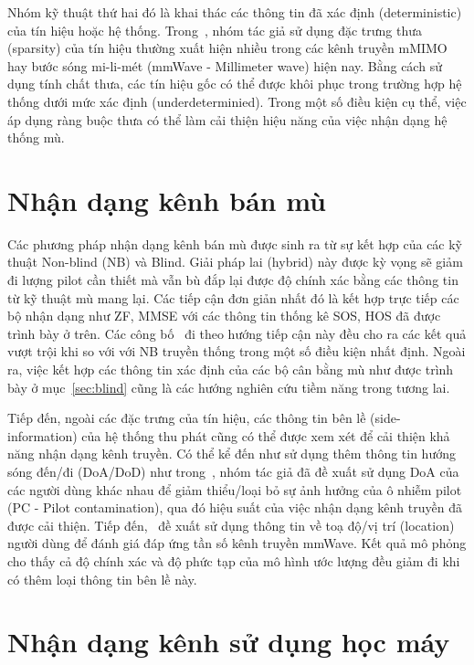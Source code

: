 Nhóm kỹ thuật thứ hai đó là khai thác các thông tin đã xác định (deterministic) của tín hiệu hoặc hệ thống. Trong~\cite{Bey2011}, nhóm tác giả sử dụng đặc trưng thưa (sparsity) của tín hiệu thường xuất hiện nhiều trong các kênh truyền mMIMO hay bước sóng mi-li-mét (mmWave - Millimeter wave) hiện nay. Bằng cách sử dụng tính chất thưa, các tín hiệu gốc có thể được khôi phục trong trường hợp hệ thống dưới mức xác định (underdeterminied). Trong một số điều kiện cụ thể, việc áp dụng ràng buộc thưa có thể làm cải thiện hiệu năng của việc nhận dạng hệ thống mù.

\section{Nhận dạng kênh bán mù} \label{sec:semi}

Các phương pháp nhận dạng kênh bán mù được sinh ra từ sự kết hợp của các kỹ thuật Non-blind (NB) và Blind. Giải pháp lai (hybrid) này được kỳ vọng sẽ giảm đi lượng pilot cần thiết mà vẫn bù đắp lại được độ chính xác bằng các thông tin từ kỹ thuật mù mang lại. Các tiếp cận đơn giản nhất đó là kết hợp trực tiếp các bộ nhận dạng như ZF, MMSE với các thông tin thống kê SOS, HOS đã được trình bày ở trên. Các công bố~\cite{Wan2008, Ladaycia2019, Rekik2021} đi theo hướng tiếp cận này đều cho ra các kết quả vượt trội khi so với với NB truyền thống trong một số điều kiện nhất định. Ngoài ra, việc kết hợp các thông tin xác định của các bộ cân bằng mù như được trình bày ở mục~\ref{sec:blind} cũng là các hướng nghiên cứu tiềm năng trong tương lai.

Tiếp đến, ngoài các đặc trưng của tín hiệu, các thông tin bên lề (side-information) của hệ thống thu phát cũng có thể được xem xét để cải thiện khả năng nhận dạng kênh truyền. Có thể kể đến như sử dụng thêm thông tin hướng sóng đến/đi (DoA/DoD) như trong~\cite{Wang2016}, nhóm tác giả đã đề xuất sử dụng DoA của các người dùng khác nhau để giảm thiểu/loại bỏ sự ảnh hưởng của ô nhiễm pilot (PC - Pilot contamination), qua đó hiệu suất của việc nhận dạng kênh truyền đã được cải thiện. Tiếp đến,~\cite{Lin2020} đề xuất sử dụng thông tin về toạ độ/vị trí (location) người dùng để đánh giá đáp ứng tần số kênh truyền mmWave. Kết quả mô phỏng cho thấy cả độ chính xác và độ phức tạp của mô hình ước lượng đều giảm đi khi có thêm loại thông tin bên lề này.

\section{Nhận dạng kênh sử dụng học máy}


